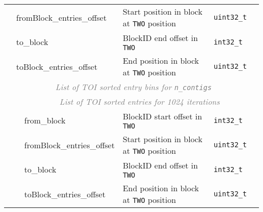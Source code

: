\documentclass[10pt]{article}
\begin{document}
\begin{table}[H]
{\begin{tabular}{|l|l|l|l|l|l|r|}
  & \multicolumn{3}{|l|}{\sf fromBlock\_entries\_offset} & Start position in block at {\tt TWO} position & {\tt uint32\_t} & \\\cline{2-7}
  & \multicolumn{3}{|l|}{\sf to\_block} & BlockID end offset in {\tt TWO} & {\tt int32\_t} & \\\cline{2-7}
  & \multicolumn{3}{|l|}{\sf toBlock\_entries\_offset} & End position in block at {\tt TWO} position & {\tt uint32\_t} & \\\cline{2-7}
  & \multicolumn{6}{|c|}{\textcolor{gray}{\it List of TOI sorted entry bins for {\tt n\_contigs } }} \\\cline{2-7}
  & & \multicolumn{5}{c|}{\textcolor{gray}{\it List of TOI sorted entries for 1024 iterations}} \\\cline{3-7}
  & & \multicolumn{2}{l|}{\sf from\_block} & BlockID start offset in {\tt TWO} & {\tt int32\_t} & \\\cline{3-7}
  & & \multicolumn{2}{l|}{\sf fromBlock\_entries\_offset} & Start position in block at {\tt TWO} position & {\tt uint32\_t} & \\\cline{3-7}
  & & \multicolumn{2}{l|}{\sf to\_block} & BlockID end offset in {\tt TWO} & {\tt int32\_t} & \\\cline{3-7}
  & & \multicolumn{2}{l|}{\sf toBlock\_entries\_offset} & End position in block at {\tt TWO} position & {\tt uint32\_t} & \\\cline{3-7}

  \hline

\end{tabular}}
\end{table}
\end{document}
